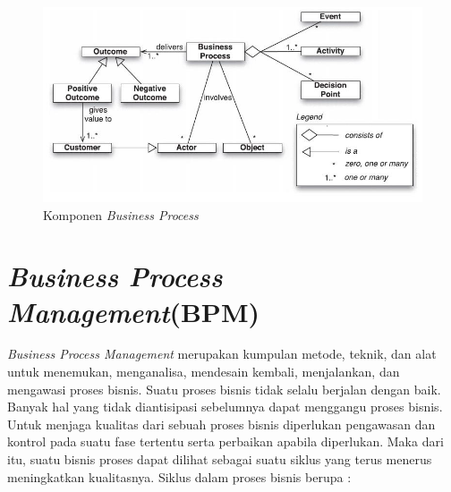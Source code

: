\begin{figure}[H]
	\centering
	\includegraphics[scale=0.7]{Gambar/Bab-2/1-bp-components}
	\caption{Komponen \textit{Business Process}} 
	\label{komponenbp}
\end{figure}





\section{\textit{Business Process Management}(BPM)}
\label{sec:bpm}
\textit{Business Process Management} merupakan kumpulan metode, teknik, dan alat untuk menemukan, menganalisa, mendesain kembali, menjalankan, dan mengawasi proses bisnis. Suatu proses bisnis tidak selalu berjalan dengan baik. Banyak hal yang tidak diantisipasi sebelumnya dapat menggangu proses bisnis. Untuk menjaga kualitas dari sebuah proses bisnis diperlukan pengawasan dan kontrol pada suatu fase tertentu serta perbaikan apabila diperlukan. Maka dari itu, suatu bisnis proses dapat dilihat sebagai suatu siklus yang terus menerus meningkatkan kualitasnya. Siklus dalam proses bisnis berupa :

